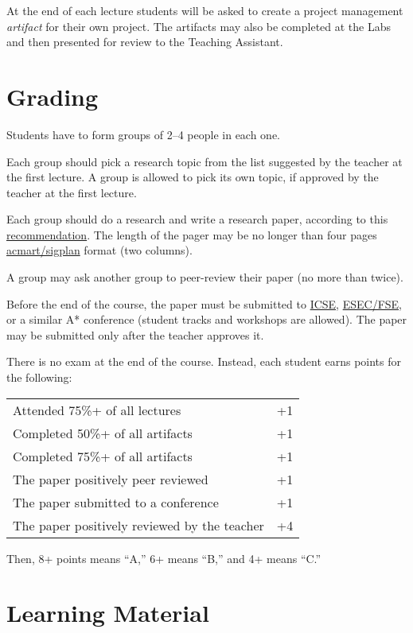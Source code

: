 \documentclass[nobrand,anonymous,nodate,nosecurity]{huawei}
\begin{document}
At the end of each lecture students will be asked to create a project management \emph{artifact} for
their own project. The artifacts may also be completed at the Labs and then presented
for review to the Teaching Assistant.

\newpage
\section*{Grading}

Students have to form groups of 2--4 people in each one.

Each group should pick a research topic from the list suggested by the teacher
at the first lecture. A group is allowed to pick its own topic, if approved
by the teacher at the first lecture.

Each group should do a research and write a research paper, according
to this \href{https://www.yegor256.com/2022/08/24/research-paper-template.html}{recommendation}.
The length of the pager may be no longer than four pages
\href{https://ctan.org/pkg/acmart}{acmart/sigplan} format (two columns).

A group may ask another group to peer-review their paper
(no more than twice).

Before the end of the course, the paper must be submitted
to \href{http://www.icse-conferences.org/}{ICSE},
\href{https://www.esec-fse.org/}{ESEC/FSE}, or a similar A* conference
(student tracks and workshops are allowed).
The paper may be submitted only after the teacher approves it.

There is no exam at the end of the course. Instead,
each student earns points for the following:\\
\renewcommand{\arraystretch}{1}
\begin{tabular}{lr}
Attended 75\%+ of all lectures & +1 \\
Completed 50\%+ of all artifacts & +1 \\
Completed 75\%+ of all artifacts & +1 \\
The paper positively peer reviewed & +1 \\
The paper submitted to a conference & +1 \\
The paper positively reviewed by the teacher & +4 \\
\end{tabular}

Then, 8+ points means ``A,'' 6+ means ``B,'' and 4+ means ``C.''

\newpage
\section*{Learning Material}
\end{document}
